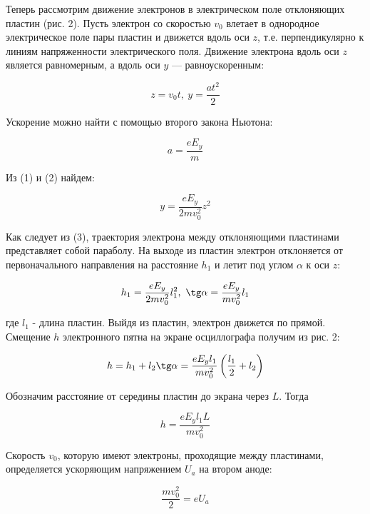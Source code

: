 \documentclass[14pt]{article}
\begin{document}
\vspace{0.5cm}
Теперь рассмотрим движение электронов в электрическом поле отклоняющих пластин (рис. 2). Пусть электрон со скоростью $v_0$ влетает в однородное электрическое поле пары пластин и движется вдоль оси $z$, т.е. перпендикулярно к линиям напряженности электрического поля. Движение электрона вдоль оси $z$ является равномерным, а вдоль оси $y$ --- равноускоренным:

\begin{equation}
z = v_0t,~
y = \frac{at^2}{2}
\end{equation}

Ускорение можно найти с помощью второго закона Ньютона:

\begin{equation}
a = \frac{eE_y}{m}
\end{equation}

\noindent Из (1) и (2) найдем:

\begin{equation}
y = \frac{eE_y}{2mv_0^2}z^2
\end{equation}

\noindent Как следует из (3), траектория электрона между отклоняющими пластинами представляет собой параболу. На выходе из пластин электрон отклоняется от первоначального направления на расстояние $h_1$ и летит под углом $\alpha$ к оси $z$:

\begin{equation}
h_1 = \frac{eE_y}{2mv_0^2}l_1^2,~ \tg \alpha = \frac{eE_y}{mv_0^2}l_1
\end{equation}

\noindent где $l_1$ - длина пластин. Выйдя из пластин, электрон движется по прямой. Смещение $h$ электронного пятна на экране осциллографа получим из рис. 2:

\begin{equation}
h = h_1 + l_2\tg \alpha = \frac{eE_yl_1}{mv_0^2}\left(\frac{l_1}{2}+l_2\right)
\end{equation}

Обозначим расстояние от середины пластин до экрана через $L$. Тогда

\begin{equation}
h =  \frac{eE_yl_1L}{mv_0^2}
\end{equation}

Скорость $v_0$, которую имеют электроны, проходящие между пластинами, определяется ускоряющим напряжением $U_a$ на втором аноде:

\begin{equation}
\frac{mv_0^2}{2} = eU_a
\end{equation}
\end{document}
